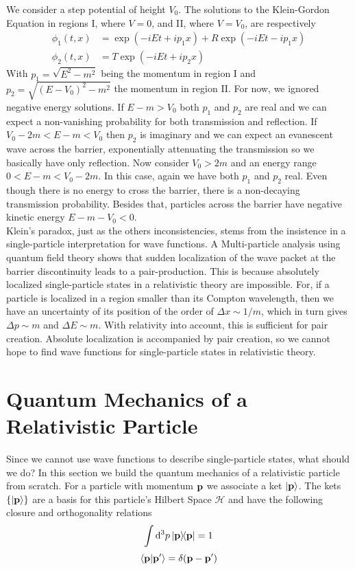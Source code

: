 We consider a step potential of height $V_0$. The solutions to the Klein-Gordon Equation in regions I, where $V=0$, and II, where $V=V_0$, are respectively 
\begin{equation}
\begin{aligned}
    \phi_{1}(t,x)&=\exp(-iEt+ip_1x)+R\exp(-iEt-ip_1x)\\
    \phi_{2}(t,x)&=T\exp(-iEt+ip_2x)
\end{aligned}
\end{equation}
With $p_1=\sqrt{E^2-m^2}$ being the momentum in region I and $p_2=\sqrt{(E-V_0)^2-m^2}$ the momentum in region II. For now, we ignored negative energy solutions. 
If $E-m>V_0$ both $p_1$ and $p_2$ are real and we can expect a non-vanishing probability for both transmission and reflection. If $V_0-2m<E-m<V_0$ then $p_2$ is imaginary and we can expect an evanescent wave across the barrier, exponentially attenuating the transmission so we basically have only reflection. Now consider $V_0>2m$ and an energy range $0<E-m<V_0-2m$. In this case, again we have both $p_1$ and $p_2$ real. Even though there is no energy to cross the barrier, there is a non-decaying transmission probability. Besides that, particles across the barrier have negative kinetic energy $E-m-V_0<0$. \\

Klein's paradox, just as the others inconsistencies, stems from the insistence in a single-particle interpretation for wave functions. A Multi-particle analysis using quantum field theory shows that sudden localization of the wave packet at the barrier discontinuity leads to a pair-production\cite{alvarez2011invitation}. This is because absolutely localized single-particle states in a relativistic theory are impossible. For, if a particle is localized in a region smaller than its Compton wavelength, then we have an uncertainty of its position of the order of $\Delta x\sim1/m$, which in turn gives $\Delta p\sim m$ and $\Delta E\sim m$.  With relativity into account, this is sufficient for pair creation. Absolute localization is accompanied by pair creation, so we cannot hope to find wave functions for single-particle states in relativistic theory.
\section{Quantum Mechanics of a Relativistic Particle}
Since we cannot use wave functions to describe single-particle states, what should we do? In this section we build the quantum mechanics of a relativistic particle from scratch.
For a particle with momentum $\vb{p}$ we associate a ket $\ket{\vb{p}}$. The kets $\{ \ket{\vb{p}}\}$ are a basis for this particle's Hilbert Space $\mathcal{H}$ and have the following closure and orthogonality relations
\begin{equation}
    \int\dd ^3p\dyad{\vb{p}}=1
    \label{closure1}
\end{equation}
\begin{equation}
    \braket{\vb{p}}{\vb{p}^\prime}=\delta(\vb{p}-\vb{p}^\prime)
    \label{orthogonality_p}
\end{equation}

